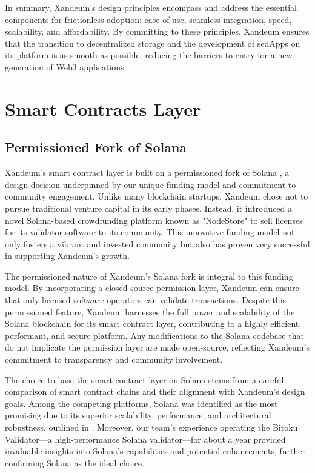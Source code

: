 \documentclass[11 pt]{article}   	%
\let\oldsection\section
\renewcommand{\section}{\clearpage\oldsection}
\begin{document}
In summary, Xandeum's design principles encompass and address the essential components for frictionless adoption: ease of use, seamless integration, speed, scalability, and affordability. By committing to these principles, Xandeum ensures that the transition to decentralized storage and the development of sedApps on its platform is as smooth as possible, reducing the barriers to entry for a new generation of Web3 applications.

\section{Smart Contracts Layer}
\subsection{Permissioned Fork of Solana}
Xandeum's smart contract layer is built on a permissioned fork of Solana \cite{yakovenko17}, a design decision underpinned by our unique funding model and commitment to community engagement. Unlike many blockchain startups, Xandeum chose not to pursue traditional venture capital in its early phases. Instead, it introduced a novel Solana-based crowdfunding platform known as "NodeStore" to sell licenses for its validator software to its community. This innovative funding model not only fosters a vibrant and invested community but also has proven very successful in supporting Xandeum's growth.

The permissioned nature of Xandeum's Solana fork is integral to this funding model. By incorporating a closed-source permission layer, Xandeum can ensure that only licensed software operators can validate transactions. Despite this permissioned feature, Xandeum harnesses the full power and scalability of the Solana blockchain for its smart contract layer, contributing to a highly efficient, performant, and secure platform. Any modifications to the Solana codebase that do not implicate the permission layer are made open-source, reflecting Xandeum's commitment to transparency and community involvement.

The choice to base the smart contract layer on Solana stems from a careful comparison of smart contract chains and their alignment with Xandeum's design goals. Among the competing platforms, Solana was identified as the most promising due to its superior scalability, performance, and architectural robustness, outlined in \cite{yakovenko19}. Moreover, our team's experience operating the Bitoku Validator—a high-performance Solana validator—for about a year provided invaluable insights into Solana's capabilities and potential enhancements, further confirming Solana as the ideal choice.
\end{document}
